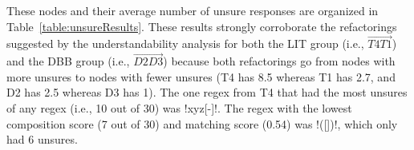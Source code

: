 These nodes and their average number of unsure responses are organized in Table~\ref{table:unsureResults}.
These results strongly corroborate the refactorings suggested by the understandability analysis for both the LIT group (i.e., $\overrightarrow{T4 T1}$) and the DBB group (i.e.,  $\overrightarrow{D2 D3}$) because both refactorings go from nodes with more unsures to nodes with fewer unsures (T4 has 8.5 whereas T1 has 2.7, and D2 has 2.5 whereas D3 has 1).
The one regex from T4 that had the most unsures of any regex (i.e., 10 out of 30) was \cverb!xyz[-]!.  The regex with the lowest composition score (7 out of 30) and matching score (0.54) was \cverb!([])!, which only had 6 unsures.
